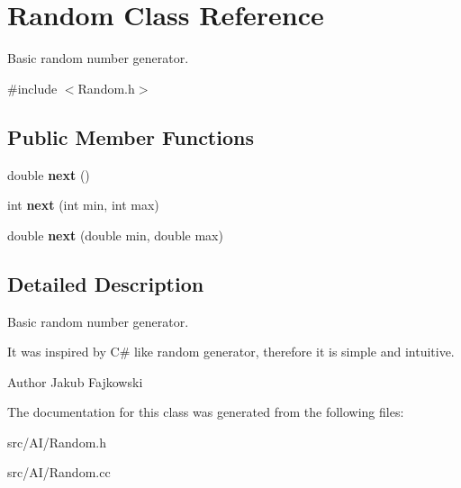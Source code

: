 \hypertarget{classRandom}{}\section{Random Class Reference}
\label{classRandom}


Basic random number generator.  




{\ttfamily \#include $<$Random.\+h$>$}

\subsection*{Public Member Functions}
\begin{DoxyCompactItemize}
\item 
double {\bfseries next} ()\hypertarget{classRandom_a496fd24cf56a81dc0e0e35bc89e22dd4}{}\label{classRandom_a496fd24cf56a81dc0e0e35bc89e22dd4}

\item 
int {\bfseries next} (int min, int max)\hypertarget{classRandom_a018a34f59cd8aa1d52261991db44346e}{}\label{classRandom_a018a34f59cd8aa1d52261991db44346e}

\item 
double {\bfseries next} (double min, double max)\hypertarget{classRandom_a0c91a649f68b231f883f102e9e5292d8}{}\label{classRandom_a0c91a649f68b231f883f102e9e5292d8}

\end{DoxyCompactItemize}


\subsection{Detailed Description}
Basic random number generator. 

It was inspired by C\# like random generator, therefore it is simple and intuitive. \begin{DoxyAuthor}{Author}
Jakub Fajkowski 
\end{DoxyAuthor}


The documentation for this class was generated from the following files\+:\begin{DoxyCompactItemize}
\item 
src/\+A\+I/Random.\+h\item 
src/\+A\+I/Random.\+cc\end{DoxyCompactItemize}
